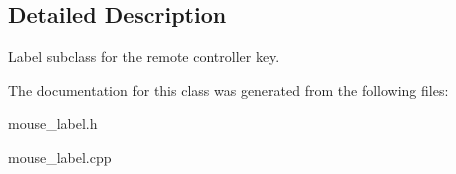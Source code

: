 \subsection{Detailed Description}
Label subclass for the remote controller key. 

The documentation for this class was generated from the following files\+:\begin{DoxyCompactItemize}
\item 
mouse\+\_\+label.\+h\item 
mouse\+\_\+label.\+cpp\end{DoxyCompactItemize}
